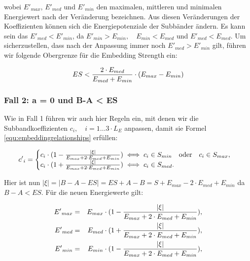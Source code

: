 wobei ${E'}_{max}$, ${E'}_{med}$ und ${E'}_{min}$ den maximalen, mittleren und minimalen Energiewert nach der Veränderung bezeichnen. Aus diesen Veränderungen der Koeffizienten können sich die Energiepotenziale der Subbänder ändern. Es kann sein das ${E'}_{med} < {E'}_{min}$, da ${E'}_{min}>{E}_{min},\quad {E}_{min}<{E}_{med}$ und ${E'}_{med}<{E}_{med}$. Um sicherzustellen, dass nach der Anpassung immer noch ${E'}_{med} > {E'}_{min}$ gilt, führen wir folgende Obergrenze für die Embedding Strength ein:

	\begin{equation}
		ES < { 2 \cdot {E}_{med} \over {E}_{med} + {E}_{min} } \cdot ( {E}_{max} - {E}_{min} )
		\label{equ:embeddingstrengthconstraint_case1}
	\end{equation}

\subsubsection{Fall 2: a = 0 und B-A < ES}

Wie in Fall 1 führen wir auch hier Regeln ein, mit denen wir die Subbandkoeffizienten ${c}_{i},\quad i=1\dots{3\cdot{L}_{E}}$ anpassen, damit sie Formel \ref{equ:embeddingrelationships} erfüllen:

	 \begin{equation}
		 {c'}_{i} = \begin{cases}
    	 				{c}_{i} \cdot ( 1 - { |\xi| \over {{E}_{max} + 2\cdot {E}_{med} + {E}_{min}} }) \iff {c}_{i} \in {S}_{min} \quad\mbox{oder}\quad {c}_{i} \in {S}_{max}, 
						\\
    					{c}_{i} \cdot ( 1 + { |\xi| \over {{E}_{max} + 2\cdot {E}_{med} + {E}_{min}} }) \iff {c}_{i} \in {S}_{med}.
  				  	\end{cases}
		  \label{equ:modifcoef_case2}
	 \end{equation}
	 
Hier ist nun  $|\xi| = |B-A-ES| = ES+A-B = S + {E}_{max} - 2\cdot {E}_{med} + {E}_{min}$ da $B-A<ES$. Für die neuen Energiewerte gilt:

	 \begin{eqnarray*}
		 {E'}_{max} & = & {E}_{max} \cdot (1 - { |\xi| \over {{E}_{max} + 2\cdot {E}_{med} + {E}_{min}} }),
		 \\ 
		 {E'}_{med} & = & {E}_{med} \cdot (1 + { |\xi| \over {{E}_{max} + 2\cdot {E}_{med} + {E}_{min}} }),
		 \\
		 {E'}_{min} & = & {E}_{min} \cdot (1 - { |\xi| \over {{E}_{max} + 2\cdot {E}_{med} + {E}_{min}} }),
	\end{eqnarray*}
	
